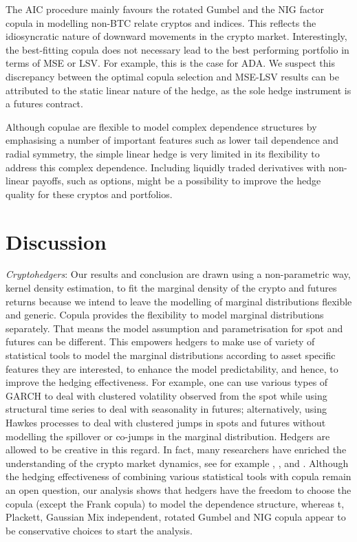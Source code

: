 The AIC procedure mainly favours the rotated Gumbel and the NIG
factor copula in modelling non-BTC relate cryptos and indices. This
reflects the idiosyncratic nature of 
downward movements in the crypto market. Interestingly, the best-fitting
copula does not necessary lead to the best performing portfolio in
terms of MSE or LSV. For example, this is the case for ADA.
We suspect this discrepancy between the optimal copula selection and
MSE-LSV results can be attributed to the static linear nature of the
hedge, as the sole hedge instrument is a futures contract. 

Although copulae are flexible to model complex dependence structures
by emphasising a number of important features such as lower tail
dependence and radial symmetry, the simple linear hedge is very
limited in its flexibility to address this complex dependence.
Including liquidly traded derivatives with non-linear payoffs, such as
options, might be a possibility to improve the hedge quality for these
cryptos and portfolios.

\section{Discussion}\label{sec:discussion}
\textit{Cryptohedgers}: Our results and conclusion are drawn using a non-parametric way, kernel density estimation,
to fit the marginal density of the crypto and futures returns because we intend to leave the modelling of marginal distributions flexible and generic.
Copula provides the flexibility to model marginal distributions separately.
That means the model assumption and parametrisation for spot and futures can be different.
This empowers hedgers to make use of variety of statistical tools to model the marginal distributions according to asset specific features they are interested,
to enhance the model predictability, and hence, to improve the hedging effectiveness.
For example, one can use various types of GARCH to deal with clustered volatility observed from the spot while using structural time series to deal with seasonality in futures;
alternatively, using Hawkes processes to deal with clustered jumps in spots and futures without modelling the spillover or co-jumps in the marginal distribution.
Hedgers are allowed to be creative in this regard. In fact, many researchers have enriched the understanding of the crypto market dynamics,
see for example \citet{kaiser2019seasonality}, \citet{gyamerah2022modelling}, and \citet{mark2022quantifying}.
Although the hedging effectiveness of combining various statistical tools with copula remain an open question,
our analysis shows that hedgers have the freedom to choose the copula (except the Frank copula) to model the dependence structure,
whereas t, Plackett, Gaussian Mix independent, rotated Gumbel and NIG copula appear to be conservative choices to start the analysis.






